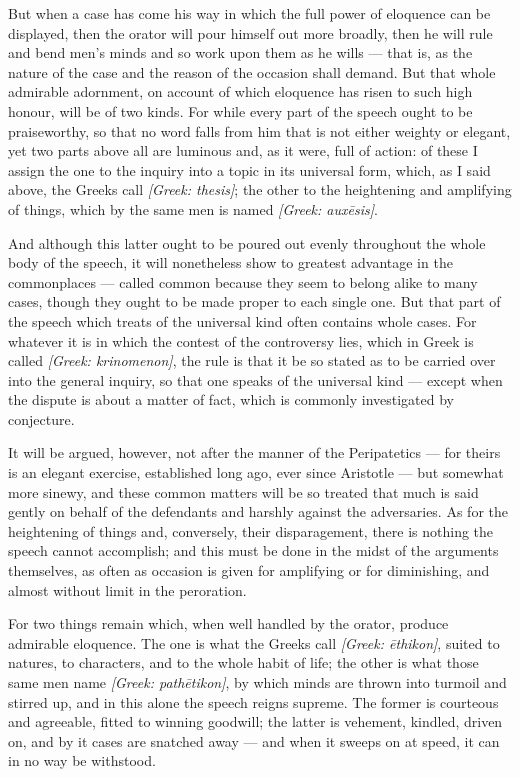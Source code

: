  But when a case has come his way in which the full power of eloquence can be displayed, then the orator will pour himself out more broadly, then he will rule and bend men's minds and so work upon them as he wills — that is, as the nature of the case and the reason of the occasion shall demand. But that whole admirable adornment, on account of which eloquence has risen to such high honour, will be of two kinds. For while every part of the speech ought to be praiseworthy, so that no word falls from him that is not either weighty or elegant, yet two parts above all are luminous and, as it were, full of action: of these I assign the one to the inquiry into a topic in its universal form, which, as I said above, the Greeks call \textit{[Greek: thesis]}; the other to the heightening and amplifying of things, which by the same men is named \textit{[Greek: auxēsis]}.

 And although this latter ought to be poured out evenly throughout the whole body of the speech, it will nonetheless show to greatest advantage in the commonplaces — called common because they seem to belong alike to many cases, though they ought to be made proper to each single one. But that part of the speech which treats of the universal kind often contains whole cases. For whatever it is in which the contest of the controversy lies, which in Greek is called \textit{[Greek: krinomenon]}, the rule is that it be so stated as to be carried over into the general inquiry, so that one speaks of the universal kind — except when the dispute is about a matter of fact, which is commonly investigated by conjecture.

 It will be argued, however, not after the manner of the Peripatetics — for theirs is an elegant exercise, established long ago, ever since Aristotle — but somewhat more sinewy, and these common matters will be so treated that much is said gently on behalf of the defendants and harshly against the adversaries. As for the heightening of things and, conversely, their disparagement, there is nothing the speech cannot accomplish; and this must be done in the midst of the arguments themselves, as often as occasion is given for amplifying or for diminishing, and almost without limit in the peroration.

 For two things remain which, when well handled by the orator, produce admirable eloquence. The one is what the Greeks call \textit{[Greek: ēthikon]}, suited to natures, to characters, and to the whole habit of life; the other is what those same men name \textit{[Greek: pathētikon]}, by which minds are thrown into turmoil and stirred up, and in this alone the speech reigns supreme. The former is courteous and agreeable, fitted to winning goodwill; the latter is vehement, kindled, driven on, and by it cases are snatched away — and when it sweeps on at speed, it can in no way be withstood.

